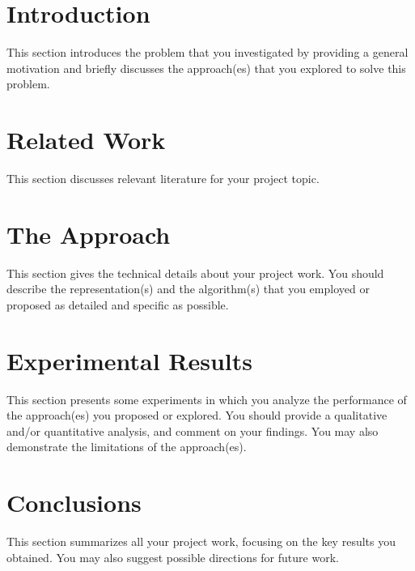 \documentclass{article}
\begin{document}
\section{Introduction}
This section introduces the problem that you investigated by providing a general motivation and briefly discusses the approach(es) that you explored to solve this problem.

\section{Related Work}
This section discusses relevant literature for your project topic.

\section{The Approach}
This section gives the technical details about your project work. You should describe the representation(s) and the algorithm(s) that you employed or proposed as detailed and specific as possible.

\section{Experimental Results}
This section presents some experiments in which you analyze the performance of the approach(es) you proposed or explored. You should provide a qualitative and/or quantitative analysis, and comment on your findings. You may also demonstrate the limitations of the approach(es).

\section{Conclusions}
This section summarizes all your project work, focusing on the key results you obtained. You may also suggest possible directions for future work.

\cite{Hinton:2006,Goodfellow:2014}



\end{document}
